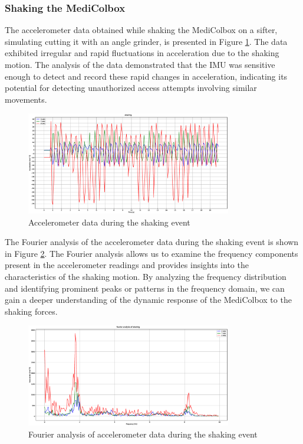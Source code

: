 \documentclass[../main.tex]{subfiles}
\begin{document}
\clearpage

\subsubsection{Shaking the MediColbox}

The accelerometer data obtained while shaking the
MediColbox on a sifter,
simulating cutting it with an angle grinder,
is presented in Figure \ref{fig:accelerometer_shaking}.
The data exhibited irregular and rapid fluctuations in
acceleration due to the shaking motion.
The analysis of the data demonstrated that the IMU was
sensitive enough to detect and record these rapid changes in
acceleration, indicating its potential for
detecting unauthorized access attempts involving
similar movements.

\begin{figure}[htbp]
    \centering
    \includegraphics[width=0.8\textwidth]{resources/figures/Acceleration_shaking.eps}
    \caption{Accelerometer data during the shaking event}
    \label{fig:accelerometer_shaking}
\end{figure}

The Fourier analysis of the accelerometer data during the
shaking event is shown in
Figure \ref{fig:fourier_accelerometer_shaking}.
The Fourier analysis allows us to examine the
frequency components present in the accelerometer readings and
provides insights into the characteristics of the shaking motion.
By analyzing the frequency distribution and
identifying prominent peaks or patterns in the frequency domain,
we can gain a deeper understanding of the
dynamic response of the MediColbox to the shaking forces.


\begin{figure}[htbp]
    \centering
    \includegraphics[width=0.8\textwidth]{resources/figures/Fourier_acceleration_shaking.eps}
    \caption{Fourier analysis of accelerometer data during the shaking event}
    \label{fig:fourier_accelerometer_shaking}
\end{figure}
\end{document}
